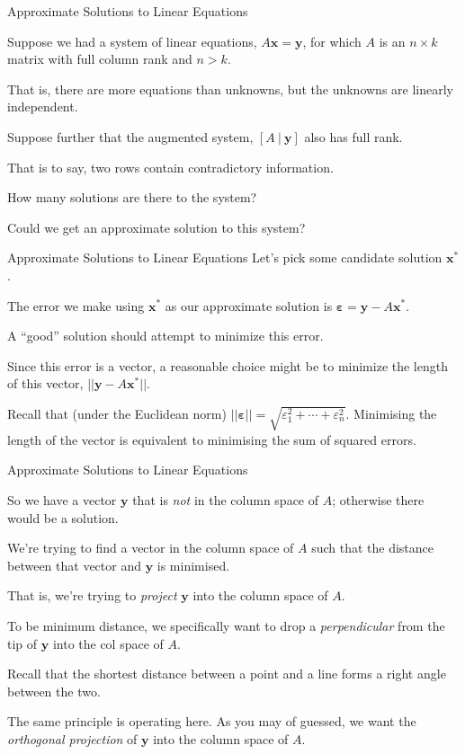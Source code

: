 \documentclass[11pt, xcolor={dvipsnames}, hyperref={colorlinks, allcolors=Blue}]{beamer}
\renewcommand{\epsilon}{\varepsilon}
\newcommand{\x}{\mathbf{x}}
\newcommand{\y}{\mathbf{y}}
\newcommand{\bepsilon}{\mathbf{\varepsilon}}
\begin{document}
\begin{frame}{Approximate Solutions to Linear Equations}

Suppose we had a system of linear equations, $A\x = \y$, for which $A$ is an $n \times k$ matrix with full column rank and $n > k$.\bigskip

That is, there are more equations than unknowns, but the unknowns are linearly independent. \bigskip

Suppose further that the augmented system, $[A \ | \ \y]$ also has full rank. \bigskip

That is to say, two rows contain contradictory information.\bigskip

How many solutions are there to the system?\bigskip

Could we get an approximate solution to this system?
\end{frame}



\begin{frame}{Approximate Solutions to Linear Equations}
Let's pick some candidate solution $\x^{*}$.\bigskip


The error we make using $\x^{*}$ as our approximate solution is $\bepsilon = \y - A\x^{*}$.\bigskip

 A ``good'' solution should attempt to minimize this error.\bigskip

 Since this error is a vector, a reasonable choice might be to minimize the length of this vector, $|| \y - A\x^{*}||$.\bigskip

 Recall that (under the Euclidean norm) $||\bepsilon|| = \sqrt{\epsilon_1^2 + \cdots + \epsilon_n^2}$. Minimising the length of the vector is equivalent to minimising the sum of squared errors.
\end{frame}


\begin{frame}{Approximate Solutions to Linear Equations}

So we have a vector $\y$ that is \emph{not} in the column space of $A$; otherwise there would be a solution.\medskip

 We're trying to find a vector in the column space of $A$ such that the distance between that vector and $\y$ is minimised.\medskip

 That is, we're trying to \emph{project} $\y$ into the column space of $A$.\medskip

 To be minimum distance, we specifically want to drop a \emph{perpendicular} from the tip of $\y$ into the col space of $A$.\medskip

 Recall that the shortest distance between a point and a line forms a right angle between the two.\medskip

 The same principle is operating here. As you may of guessed, we want the \emph{orthogonal projection} of $\y$ into the column space of $A$.
\end{frame}
\end{document}

